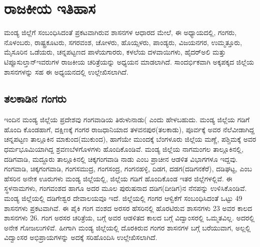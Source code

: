 \chapter{ರಾಜಕೀಯ ಇತಿಹಾಸ}

ಮಂಡ್ಯ ಜಿಲ್ಲೆಗೆ ಸಂಬಂಧಿಸಿದಂತೆ ಪ್ರಕಟವಾಗಿರುವ ಶಾಸನಗಳ ಆಧಾರದ ಮೇಲೆ, ಈ ಅಧ್ಯಾಯದಲ್ಲಿ, ಗಂಗರು, ನೊಳಂಬರು, ರಾಷ್ಟ್ರಕೂಟರು, ಸಗರವಂಶ, ಚೋಳರು, ಹೊಯ್ಸಳರು, ಪಾಂಡ್ಯರು, ವಿಜಯನಗರ, ಉಮ್ಮತ್ತೂರು, ಮೈಸೂರಿನ ಒಡೆಯರು, ಚನ್ನಪಟ್ಟಣದ ಪಾಳೆಯಗಾರರು, ಕಳಲೆಯ ದಳವಾಯಿಗಳು, ಹೈದರ್​ಅಲಿ ಮತ್ತು ಟಿಪ್ಪೂಸುಲ್ತಾನ್​ ಇವರುಗಳ ರಾಜಕೀಯ ಚರಿತ್ರೆಯನ್ನು ಅಧ್ಯಯನ ಮಾಡಲಾಗಿದೆ. ಸಾಂದರ್ಭಿಕವಾಗಿ ಅಕ್ಕಪಕ್ಕದ ಜಿಲ್ಲೆಯ ಶಾಸನಗಳನ್ನು ಸಹ ಈ ಅಧ್ಯಯನದಲ್ಲಿ ಉಲ್ಲೇಖಿಸಲಾಗಿದೆ.

\section*{ತಲಕಾಡಿನ ಗಂಗರು}

ಇಂದಿನ ಮಂಡ್ಯ ಜಿಲ್ಲೆಯ ಪ್ರದೇಶವು ಗಂಗವಾಡಿಯ ತಿರುಳುನಾಡು( ಎಂದು ಹೇಳಬಹುದು. ಮಂಡ್ಯ ಜಿಲ್ಲೆಯ ಗಡಿಗೆ ಹೊಂದಿ ಕೊಂಡಹಾಗೆ, ದಕ್ಷಿಣಕ್ಕೆ ಗಂಗರ ರಾಜಧಾನಿಯಾದ ತಳವನಪುರ(ತಲಕಾಡು), ಪೂರ್ವಕ್ಕೆ ಅವರ ನೆಲೆವೀಡಾಗಿದ್ದ ಚನ್ನಪಟ್ಟಣ ತಾಲ್ಲೂಕಿನ ಮಾಕುಂದ(ಮುಕುಂದ), ಹಾಗೆಯೇ ಮುಂದಕ್ಕೆ ಬೆಂಗಳೂರು ಜಿಲ್ಲೆಯ ಮಣ್ಣೆ, ಪಶ್ಚಿಮಕ್ಕೆ ಅವರ ಧರ್ಮಭೂಮಿಯಾಗಿದ್ದ ಶ್ರವಣಬೆಳಗೊಳಗಳು ಹೊಂದಿಕೊಂಡಿವೆ. ಮಂಡ್ಯ ಜಿಲ್ಲೆಯ ನಾಗಮಂಗಲ ತಾಲ್ಲೂಕಿನಲ್ಲಿ, ದಡಿಗವಾಡಿ, ಮದ್ದೂರು ತಾಲ್ಲೂಕಿನಲ್ಲಿ ಚಿಕ್ಕಗಂಗವಾಡಿ ನಾಡು ಎಂಬ ಪ್ರಾಚೀನ ಆಡಳಿತ ವಿಭಾಗಗಳೂ ಇದ್ದವು. ಗಂಗವಾಡಿ, ಚಿಕ್ಕಗಂಗವಾಡಿ, ಗಂಗಸಮುದ್ರ, ಗಂಗಸಂದ್ರ, ಗಂಗನಹಳ್ಳಿ, ದಿಡಗ, ದಡಗ(ದಡಿಗನಕೆರೆ), ದಡಿಘಟ್ಟ, ಎಂಬ ಹೆಸರಿನ ಅನೇಕ ಊರುಗಳು ಮಂಡ್ಯ ಜಿಲ್ಲೆಯಲ್ಲಿ, ಜಿಲ್ಲೆಯ ಗಡಿಗೆ ಹೊಂದಿಕೊಂಡ ಇತರ ಜಿಲ್ಲೆಗಳಲ್ಲಿವೆ. ಈ ಸ್ಥಳನಾಮಗಳು, ಗಂಗವಂಶದ ಹಾಗೂ ಅದರ ಮೂಲ ಪುರುಷನಾದ ದಡಿಗ(ದೀಡಿಗ)ನ ನೆನಪನ್ನು ಉಳಿಸಿಕೊಂಡಿವೆ. ಮಂಡ್ಯ ಜಿಲ್ಲೆಯಲ್ಲಿ ದಡಿಗೇಶ್ವರ ದೇವಾಲಯವೂ ಇದೆ. ಜಿಲ್ಲೆಯಲ್ಲಿ ಗಂಗರ ಆಳ್ವಿಕೆಗೆ ಸಂಬಂಧಿಸಿದಂತೆ ಒಟ್ಟು 49 ಶಾಸನಗಳು ಪ್ರಕಟವಾಗಿವೆ. ಈ ಪೈಕಿ ಗಂಗ ವಂಶದ ಅರಸರ ಹೆಸರಿನಲ್ಲಿ ಹೊರಟಿರುವ ಶಾಸನಗಳು 23 ಅವರ ಕಾಲದ ಶಾಸನಗಳು 26. ಗಂಗ ಅರಸರ ಚರಿತ್ರೆಯ, ಬಗ್ಗೆ ಅವರ ಆಡಳಿತದ ಕಾಲದ ಬಗ್ಗೆ ವಿದ್ವಾಂಸರಲ್ಲಿ ಒಮ್ಮತವಿಲ್ಲ. ಅದರಲ್ಲಿ ಅನೇಕ ಗೋಜಲುಗಳಿವೆ. ಹೀಗಾಗಿ ಮಂಡ್ಯ ಜಿಲ್ಲೆಯಲ್ಲಿ ದೊರಕಿರುವ ಗಂಗರ ಶಾಸನಗಳ ಬಗ್ಗೆ ಬರೆಯುವಾಗ, ಅಲ್ಲಲ್ಲಿ ವಿದ್ವಾಂಸರ ಅಭಿಪ್ರಾಯಗಳನ್ನು ಅದಕ್ಕೆ ಸರಿಹೊಂದಿಸಿ ಉಲ್ಲೇಖಿಸಲಾಗಿದೆ.

